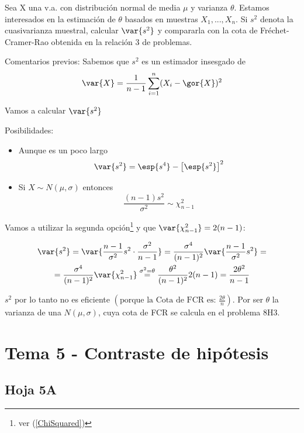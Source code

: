 \begin{problem}[9]
Sea X una v.a. con distribución normal de media $\mu$ y varianza $\theta$. Estamos interesados en la estimación de $\theta$ basados en muestras $X_1,...,X_n$. Si $s^2$ denota la cuasivarianza muestral, calcular $\var{s^2}$ y compararla con la cota de Fréchet-Cramer-Rao obtenida en la relación 3 de problemas.
\solution

Comentarios previos: Sabemos que $s^2$ es un estimador insesgado de
\[ \var{X} = \frac{1}{n - 1} \sum_{i=1}^n (X_i - \gor{X})^2 \]

Vamos a calcular $\var{s^2}$

Posibilidades:
\begin{itemize}
\item Aunque es un poco largo
\[
\var{s^2} = \esp{s^4} - \left[\esp{s^2}\right]^2
\]

\item Si $X \sim N(\mu,\sigma)$ entonces \[\frac{(n-1)s^2}{\sigma^2} \sim \chi_{n-1}^2 \]
\end{itemize}

Vamos a utilizar la segunda opción\footnote{ver (\ref{ChiSquared})} y que $\var{\chi^2_{n - 1}} = 2 (n - 1)$:

\begin{gather*}
\var{s^2} =
\var{\frac{n-1}{\sigma^2}s^2\cdot\frac{\sigma^2}{n-1}} =
\frac{\sigma^4}{(n-1)^2} \var{\frac{n-1}{\sigma^2}s^2} =\\
= \frac{\sigma^4}{(n-1)^2} \var{\chi^2_{n-1}} \stackrel{\sigma^2 = \theta}{=}
\frac{\theta^2}{(n-1)^2}2(n-1) =
\frac{2\theta^2}{n-1}
\end{gather*}

$s^2$ por lo tanto no es eficiente $\left( \text{porque la Cota de FCR es: } \displaystyle\frac{2\theta}{n}\right)$.
Por ser $\theta$ la varianza de una $N(\mu,\sigma)$, cuya cota de FCR se calcula en el problema 8H3.

\end{problem}

\newpage
\section{Tema 5 - Contraste de hipótesis}
\subsection{Hoja 5A}

